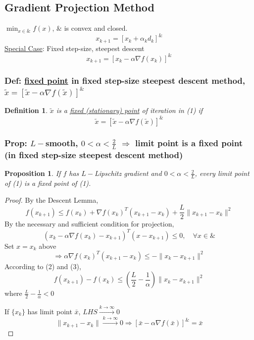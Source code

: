 \documentclass[11pt,a4paper]{article}
\newtheorem{proposition}{Proposition}
\newtheorem{definition}{Definition}
\begin{document}
\subsection{Gradient Projection Method}
$\min_{x\in\&}f(x)$, $\&$ is convex and closed.
$$x_{k+1}=[x_k+\alpha_k d_k]^\&$$
\underline{Special Case}: Fixed step-size, steepest descent
\begin{equation}
    x_{k+1}=[x_k-\alpha \nabla f(x_k)]^\&
\end{equation}
\subsubsection{Def: \underline{fixed point} in fixed step-size steepest descent method, $\tilde{x}=[\tilde{x}-\alpha \nabla f(\tilde{x})]^\&$}
\begin{definition}
    $\tilde{x}$ is a \underline{fixed (stationary) point} of iteration in (1) if $$\tilde{x}=[\tilde{x}-\alpha \nabla f(\tilde{x})]^\&$$
\end{definition}

\subsubsection{Prop: $L-$smooth, $0<\alpha<\frac{2}{L}$ $\Rightarrow$ limit point is a fixed point (in fixed step-size steepest descent method)}
\begin{proposition}
    If $f$ has $L-$Lipschitz gradient and $0<\alpha<\frac{2}{L}$, every limit point of (1) is a fixed point of (1).
\end{proposition}
\begin{proof}
By the Descent Lemma,
\begin{equation}
    f(x_{k+1})\leq f(x_k)+\nabla f(x_k)^T(x_{k+1}-x_k)+\frac{L}{2}\|x_{k+1}-x_k\|^2
\end{equation}
By the necessary and sufficient condition for projection,
\begin{equation}
    (x_k-\alpha \nabla f(x_k)-x_{k+1})^T(x-x_{k+1})\leq 0,\quad \forall x\in\&
    \nonumber
\end{equation}
Set $x=x_k$ above
\begin{equation}
    \Rightarrow	\alpha \nabla f(x_k)^T(x_{k+1}-x_k)\leq -\|x_k-x_{k+1}\|^2
\end{equation}
According to (2) and (3), $$f(x_{k+1})-f(x_k)\leq (\frac{L}{2}-\frac{1}{\alpha})\|x_k-x_{k+1}\|^2$$ where $\frac{L}{2}-\frac{1}{\alpha}<0$

If $\{x_k\}$ has limit point $\bar{x}$, $LHS \stackrel{k \rightarrow \infty}{\longrightarrow}0$ $$\|x_{k+1}-x_{k}\|\stackrel{k \rightarrow \infty}{\longrightarrow}0 \Rightarrow [\bar{x}-\alpha \nabla f(\bar{x})]^\&=\bar{x}$$
\end{proof}
\end{document}

